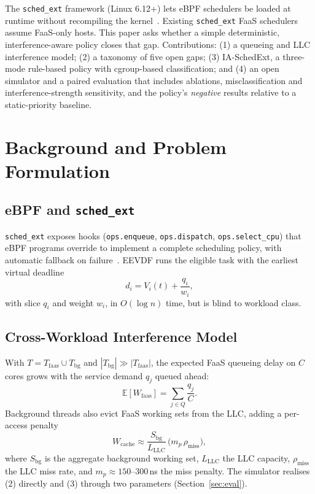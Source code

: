 \documentclass[journal]{IEEEtran}
\begin{document}
The \texttt{sched\_ext} framework (Linux 6.12+) lets eBPF schedulers be loaded at runtime without recompiling the kernel~\cite{schedext}. Existing \texttt{sched\_ext} FaaS schedulers~\cite{metis,emfs} assume FaaS-only hosts. This paper asks whether a simple deterministic, interference-aware policy closes that gap. Contributions: (1) a queueing and LLC interference model; (2) a taxonomy of five open gaps; (3) IA-SchedExt, a three-mode rule-based policy with cgroup-based classification; and (4) an open simulator and a paired evaluation that includes ablations, misclassification and interference-strength sensitivity, and the policy's \emph{negative} results relative to a static-priority baseline.

\section{Background and Problem Formulation}
\subsection{eBPF and \texttt{sched\_ext}}
\texttt{sched\_ext} exposes hooks (\texttt{ops.enqueue}, \texttt{ops.dispatch}, \texttt{ops.select\_cpu}) that eBPF programs override to implement a complete scheduling policy, with automatic fallback on failure~\cite{schedext}. EEVDF runs the eligible task with the earliest virtual deadline
\begin{equation}
d_i=V_i(t)+\frac{q_i}{w_i},
\end{equation}
with slice $q_i$ and weight $w_i$, in $O(\log n)$ time, but is blind to workload class.

\subsection{Cross-Workload Interference Model}
With $T=T_{\mathrm{faas}}\cup T_{\mathrm{bg}}$ and $|T_{\mathrm{bg}}|\gg|T_{\mathrm{faas}}|$, the expected FaaS queueing delay on $C$ cores grows with the service demand $q_j$ queued ahead:
\begin{equation}
\mathbb E[W_{\mathrm{faas}}]=\sum_{j\in Q}\frac{q_j}{C}.
\end{equation}
Background threads also evict FaaS working sets from the LLC, adding a per-access penalty
\begin{equation}
W_{\mathrm{cache}}\approx\frac{S_{\mathrm{bg}}}{L_{\mathrm{LLC}}}\,\big(m_p\,\rho_{\mathrm{miss}}\big),
\end{equation}
where $S_{\mathrm{bg}}$ is the aggregate background working set, $L_{\mathrm{LLC}}$ the LLC capacity, $\rho_{\mathrm{miss}}$ the LLC miss rate, and $m_p\approx150$--$300$\,ns the miss penalty. The simulator realises (2) directly and (3) through two parameters (Section~\ref{sec:eval}).
\end{document}
